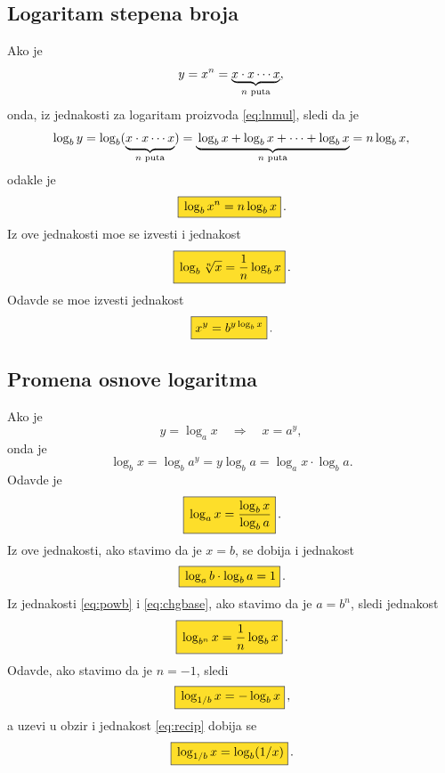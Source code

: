 \documentclass[12pt, twoside, a4paper]{article}
\def\loga{\log_a}
\def\logb{\log_b}
\def\okvir#1{\,\fcolorbox{black}{Goldenrod}{$\displaystyle{\mathstrut #1}$}\,}
\def\sledi{{\quad\Rightarrow\quad}}
\begin{document}
\subsection{Logaritam stepena broja}

Ako je
$$
y=x^n=\underbrace{x\cdot x\cdots x}_{\text{$\mathstrut n$ puta}},
$$
onda, iz jednakosti za logaritam proizvoda \eqref{eq:lnmul}, sledi da je
$$
\logb y=\logb (\underbrace{\mathstrut x\cdot x\cdots x}_{\text{$n$ puta}})
=\underbrace{\mathstrut \logb x+\logb x+\cdots+\logb x}_{\text{$n$ puta}}
=n\logb x,
$$
odakle je
\begin{equation}
\okvir{\logb x^n=n\logb x}.
\label{eq:bpow}
\end{equation}
Iz ove jednakosti mo{\zv}e se izvesti i jednakost
\begin{equation}
\okvir{\logb\sqrt[n] x={1\over n}\logb x}.
\label{eq:lnroot}
\end{equation}
Odavde se mo{\zv}e izvesti jednakost
\begin{equation}
\okvir{x^y=b^{y\logb x}}.
\label{eq:power}
\end{equation}


\subsection{Promena osnove logaritma}

Ako je
$$
y = \loga x\sledi x = a^y,
$$
onda je 
$$
\logb x=\logb a^y=y\logb a=\loga x\cdot\logb a.
$$
Odavde je
\begin{equation}
\okvir{\loga x={\logb x\over\logb a}}.
\label{eq:chgbase}
\end{equation}
Iz ove jednakosti, ako stavimo da je $x=b$, se dobija i jednakost
\begin{equation}
\okvir{\loga b\cdot\logb a = 1}.
\end{equation}
Iz jednakosti \eqref{eq:powb} i \eqref{eq:chgbase}, ako stavimo da je $a=b^n$, sledi jednakost
\begin{equation}
\okvir{\log_{b^n}x = {1\over n}\logb x}.
\label{eq:powbase}
\end{equation}
Odavde, ako stavimo da je $n=-1$, sledi
\begin{equation}
\okvir{\log_{1/b}x = -\logb x},
\end{equation}
a uzev{\sv}i u obzir i jednakost \eqref{eq:recip} dobija se
\begin{equation}
\okvir{\log_{1/b}x = \logb(1/x)}.
\end{equation}
\end{document}
